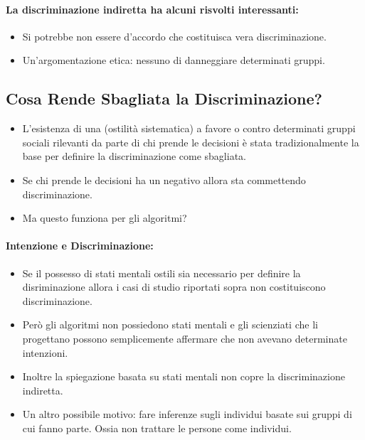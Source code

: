 \paragraph{La discriminazione indiretta ha alcuni risvolti interessanti:}

\begin{itemize}
  \item Si potrebbe non essere d'accordo che costituisca vera discriminazione. 
  \item Un'argomentazione etica: nessuno  di danneggiare determinati gruppi.
\end{itemize}

\subsection{Cosa Rende Sbagliata la Discriminazione?}

\begin{itemize}
  \item L'esistenza di una  (ostilità sistematica) a favore o contro determinati gruppi sociali rilevanti da parte di chi prende le decisioni è stata tradizionalmente la base per definire la discriminazione come sbagliata. 
  \item Se chi prende le decisioni ha un  negativo allora sta commettendo discriminazione. 
  \item Ma questo funziona per gli algoritmi?
\end{itemize}

\paragraph{Intenzione e Discriminazione:}

\begin{itemize}
  \item Se il possesso di stati mentali ostili sia necessario per definire la disriminazione allora i casi di studio riportati sopra non costituiscono discriminazione. 
  \item Però gli algoritmi non possiedono stati mentali e gli scienziati che li progettano possono semplicemente affermare che non avevano determinate intenzioni. 
  \item Inoltre la spiegazione basata su stati mentali non copre la discriminazione indiretta.
  \item Un altro possibile motivo: fare inferenze sugli individui basate sui gruppi di cui fanno parte. Ossia non trattare le persone come individui.
\end{itemize}

